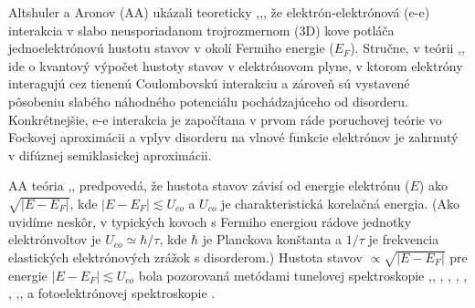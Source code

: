 


Altshuler a Aronov (AA) ukázali teoreticky \cite{Altshuler1},\cite{Altshuler3},\cite{Altshuler4}, že elektrón-elektrónová (e-e) interakcia v slabo neusporiadanom trojrozmernom (3D) kove potláča jednoelektrónovú hustotu
 stavov v okolí Fermiho energie ($E_F$). Stručne, v teórii \cite{Altshuler1},\cite{Altshuler3},\cite{Altshuler4} ide o kvantový výpočet hustoty
stavov v elektrónovom plyne, v ktorom elektróny interagujú cez tienenú Coulombovskú interakciu a zároveň sú vystavené pôsobeniu slabého
náhodného potenciálu pochádzajúceho od disorderu. Konkrétnejšie, e-e interakcia je započítana v prvom ráde poruchovej teórie vo Fockovej aproximácii a
vplyv disorderu na vlnové funkcie elektrónov je zahrnutý v difúznej semiklasickej aproximácii.

 AA teória \cite{Altshuler1},\cite{Altshuler3},\cite{Altshuler4} predpovedá, že hustota stavov závisí od energie elektrónu ($E$) ako $\sqrt{|E-E_F|}$, kde $|E-E_F| \lesssim U_{co}$ a $U_{co}$ je charakteristická korelačná energia. (Ako uvidíme neskôr, v typických kovoch s Fermiho energiou rádove jednotky elektrónvoltov je $U_{co} \simeq \hbar/\tau$, kde $\hbar$ je Planckova konštanta a $1/\tau$ je frekvencia elastických elektrónových zrážok s disorderom.) Hustota stavov $\propto \sqrt{|E-E_F|}$ pre energie $|E-E_F| \lesssim U_{co}$ bola pozorovaná metódami tunelovej spektroskopie \cite{Abeles},\cite{Dynes},\cite{McMillan2}
\cite{ImryOvadyahu}, \cite{Schmitz1}, \cite{Schmitz2}, \cite{Escudero}, \cite{Teizer}, \cite{Mazur},\cite{Luna2014}, \cite{Luna2015} a fotoelektrónovej spektroskopie \cite{Kobayashi}.




